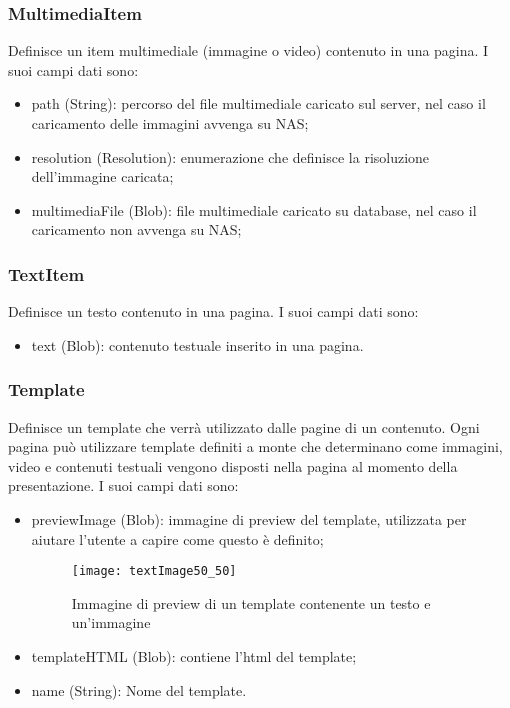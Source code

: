 \subsubsection{MultimediaItem}
Definisce un item multimediale (immagine o video) contenuto in una pagina. I suoi campi dati sono:
\begin{itemize}
    \item path (String): percorso del file multimediale caricato sul server, nel caso il caricamento delle immagini avvenga su NAS;
    \item resolution (Resolution): enumerazione che definisce la risoluzione dell'immagine caricata;
    \item multimediaFile (Blob): file multimediale caricato su database, nel caso il caricamento non avvenga su NAS;
\end{itemize}

\subsubsection{TextItem}
Definisce un testo contenuto in una pagina. I suoi campi dati sono:
\begin{itemize}
    \item text (Blob): contenuto testuale inserito in una pagina.
\end{itemize}

\subsubsection{Template}
Definisce un template che verrà utilizzato dalle pagine di un contenuto. Ogni pagina può utilizzare template definiti a monte che determinano come immagini, video e contenuti testuali vengono disposti nella pagina al momento della presentazione. I suoi campi dati sono:
\begin{itemize}
    \item previewImage (Blob): immagine di preview del template, utilizzata per aiutare l'utente a capire come questo è definito;
    \begin{figure}[h]
        \begin{center}
        \texttt{[image: textImage50\_50]}
        \caption{Immagine di preview di un template contenente un testo e un'immagine}
        \label{fig:figure15}
        \end{center}
    \end{figure}
    \item templateHTML (Blob): contiene l'html del template;
    \item name (String): Nome del template.
\end{itemize}

